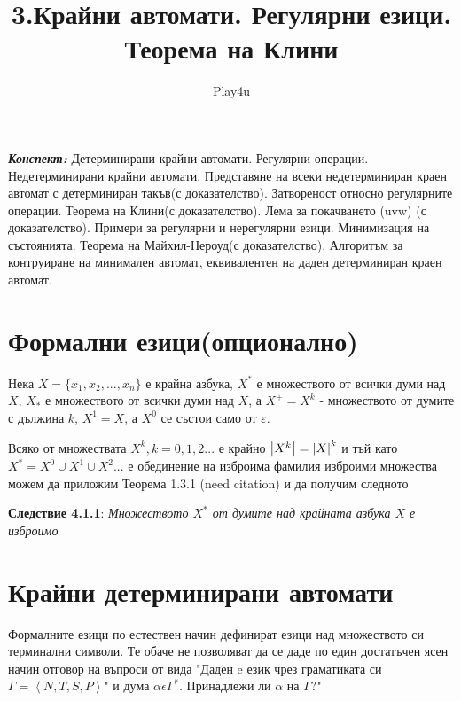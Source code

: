 \documentclass[11pt]{article} %
\title{3.Крайни автомати. Регулярни езици. Теорема на Клини}
\author{Play4u}
\begin{document}
\maketitle

\textbf{\textit{Конспект:}} Детерминирани крайни автомати. Регулярни операции. Недетерминирани крайни автомати. Представяне на всеки недетерминиран краен автомат с детерминиран такъв(с доказателство). Затвореност относно регулярните операции. Теорема на Клини(с доказателство). Лема за покачването (uvw) (с доказателство). Примери за регулярни и нерегулярни езици. Минимизация на състоянията. Теорема на Майхил-Нероуд(с доказателство). Алгоритъм за контруиране на минимален автомат, еквивалентен на даден детерминиран краен автомат.

\newcommand{\lrangle}[1]{\left\langle #1 \right\rangle}

\newcommand{\belongsTo}{\in}
\newcommand{\notBelongsTo}{\centernot\in}
\newcommand{\kda}{A = <Q, X, q_{0}, \delta, F>}

\newcommand{\italicBold}[1]{\textbf{\emph{#1}}}
\newcommand{\definition}{\italicBold{Дефиниция:}}
\newcommand{\theorem}{\italicBold{Теорема:}}
\newcommand{\lemma}{\italicBold{Лема:}}
\newcommand{\proof}{\italicBold{Доказателство:}}

\newcommand{\curlies}[1]{\{#1\}}

\section{Формални езици(опционално)}

Нека $X = \{x_1, x_2, ..., x_n\}$ е крайна азбука, $X^*$ е множеството от всички думи над $X$, $X_{*}$ е множеството от всички думи над $X$, а $X^{+} = X^{k}$ 
- множеството от думите с дължина 
$k$, $X^{1} = X$, а $X^{0}$ 
се състои само от $\varepsilon$. \par

Всяко от множествата $X^{k}, k = 0, 1, 2 ...$ е крайно $\abs{X^{k}} = \abs{X}^{k}$ и тъй като $X^{*} = X^{0} \cup X^{1} \cup X^{2}...$ е обединение на изброима фамилия изброими множества можем да приложим Теорема 1.3.1 (need citation) и да получим следното \par

\textbf{Следствие 4.1.1}: \emph{Множеството $X^{*}$ от думите над крайната азбука $X$ е изброимо} \par
   

\section{Крайни детерминирани автомати}
Формалните езици по естествен начин дефинират езици над множеството си терминални символи. Те обаче не позволяват да се даде по един достатъчен ясен начин отговор на въпроси от вида "Даден e език чрез граматиката си $\Gamma = \left\langle N, T, S, P \right\rangle$"
и дума $\alpha \epsilon \Gamma^*.$ Принадлежи ли $\alpha$ на $\Gamma?$" \par
\end{document}
